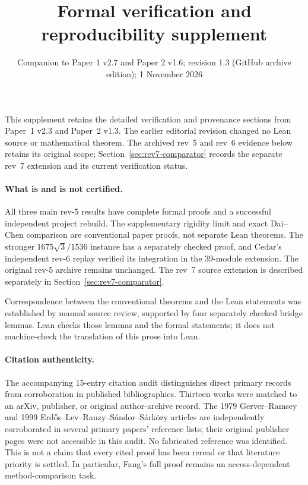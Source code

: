 \documentclass[11pt]{article}
\title{Formal verification and reproducibility supplement}
\author{}
\date{Companion to Paper 1 v2.7 and Paper 2 v1.6; revision 1.3 (GitHub archive edition); 1 November 2026}
\begin{document}
\maketitle
This supplement retains the detailed verification and provenance sections from Paper~1 v2.3 and Paper~2 v1.3. The earlier editorial revision changed no Lean source or mathematical theorem. The archived rev~5 and rev~6 evidence below retains its original scope; Section~\ref{sec:rev7-comparator} records the separate rev~7 extension and its current verification status.

\paragraph{What is and is not certified.}
All three main rev-5 results have complete formal proofs and a successful independent project rebuild. The supplementary rigidity limit and exact Dai--Chen comparison are conventional paper proofs, not separate Lean theorems. The stronger $1675\sqrt3/1536$ instance has a separately checked proof, and Cedar's independent rev-6 replay verified its integration in the 39-module extension. The original rev-5 archive remains unchanged. The rev~7 source extension is described separately in Section~\ref{sec:rev7-comparator}.

Correspondence between the conventional theorems and the Lean statements was
established by manual source review, supported by four separately checked
bridge lemmas. Lean checks those lemmas and the formal statements; it does not
machine-check the translation of this prose into Lean.

\paragraph{Citation authenticity.}
The accompanying 15-entry citation audit distinguishes direct primary records
from corroboration in published bibliographies. Thirteen works were matched to
an arXiv, publisher, or original author-archive record. The 1979 Gerver--Ramsey
and 1999 Erd\H{o}s--Lev--Rauzy--S\'andor--S\'ark\"ozy articles are independently
corroborated in several primary papers' reference lists; their original
publisher pages were not accessible in this audit. No fabricated reference was
identified. This is not a claim that every cited proof has been reread or that
literature priority is settled. In particular, Fang's full proof remains an
access-dependent method-comparison task.
\end{document}
